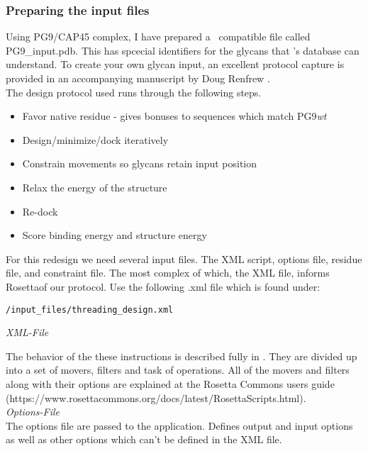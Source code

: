 \subsubsection{Preparing the input files}
Using PG9/CAP45 complex, I have prepared a \rosetta~compatible file called PG9\_input.pdb. This has spcecial identifiers for the glycans that \rosetta 's database can understand. To create your own glycan input, an excellent protocol capture is provided in an accompanying manuscript by Doug Renfrew \citep{Renfrew:2012ci}. \\

The design protocol used runs through the following steps.

\begin{itemize}
\item Favor native residue - gives bonuses to sequences which match PG9\textit{wt}
\item Design/minimize/dock iteratively
\item Constrain movements so glycans retain input position
\item Relax the energy of the structure
\item Re-dock
\item Score binding energy and structure energy
\end{itemize}

For this redesign we need several input files. The XML script, options file, residue file, and constraint file. The most complex of which, the XML file, informs Rosettaof our protocol. Use the following .xml file which is found under:

\begin{verbatim}
/input_files/threading_design.xml
\end{verbatim}

\textit{XML-File}



The behavior of the these instructions is described fully in \citep{Fleishman:2011ji}. They are divided up into a set of movers, filters and task of operations. All of the movers and filters along with their options are explained at the Rosetta Commons users guide (https://www.rosettacommons.org/docs/latest/RosettaScripts.html). \\

\textit{Options-File}\\
The options file are passed to the application. Defines output and input options as well as other options which can't be defined in the XML file.

